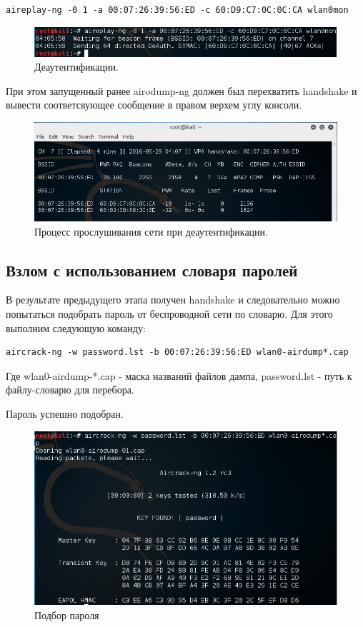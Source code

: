 \documentclass[10pt,a4paper]{article}
\begin{document}
\begin{verbatim}
aireplay-ng -0 1 -a 00:07:26:39:56:ED -c 60:D9:C7:0C:0C:CA wlan0mon
\end{verbatim}

\begin{figure}[h]
\centering
\includegraphics[width=\textwidth]{airoplay}
\caption{Деаутентификации.}
\end{figure}

При этом запущенный ранее airodump-ng должен был перехватить handshake и вывести соответсвующее сообщение в правом верхем углу консоли.

\begin{figure}[h]
\centering
\includegraphics[width=\textwidth]{airodump_2}
\caption{Процесс прослушивания сети при деаутентификации.}
\end{figure}


\subsection{Взлом с использованием словаря паролей}
В результате предыдущего этапа получен handshake и следовательно можно попытаться подобрать пароль от беспроводной сети по словарю. Для этого выполним следующую команду:
\begin{verbatim}
aircrack-ng -w password.lst -b 00:07:26:39:56:ED wlan0-airdump*.cap
\end{verbatim}
Где wlan0-airdump-*.cap - маска названий файлов дампа, password.lst - путь к файлу-словарю для перебора.

Пароль успешно подобран.
\begin{figure}[h]
\centering
\includegraphics[width=\textwidth]{aircrack}
\caption{Подбор пароля}
\end{figure}
\end{document}
